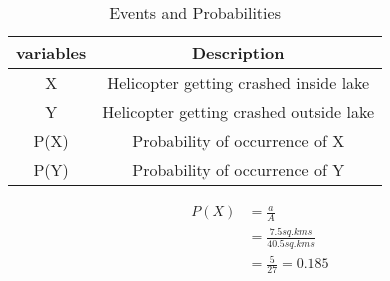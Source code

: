 \documentclass[11pt,a4paper,twocolumn]{article}
\begin{document}
\begin{table}[h!]
    \label{Table-2}
    \caption{Events and Probabilities}
    \centering
    \begin{tabular}{|c|c|}
    \hline
        variables & Description\\
        \hline
        X&Helicopter getting crashed inside lake\\
        \hline
        Y&Helicopter getting crashed outside lake\\
        \hline
        P(X)&Probability of occurrence of X\\
        \hline
        P(Y)&Probability of occurrence of Y\\
        \hline
    \end{tabular}
\end{table}
\begin{align}
    P(X)&=\frac{a}{A}\\
    &=\frac{7.5sq.kms}{40.5sq.kms}\\
    &=\frac{5}{27}=0.185
\end{align}

\end{document}
